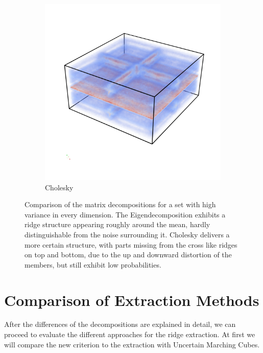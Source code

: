 \begin{figure}
\begin{subfigure}[b]{0.49\textwidth}
        \includegraphics[trim=0 350 0 300, clip=true, width=\textwidth]{Images/highuncChol.png}
        \caption{Cholesky}
        \label{fig:HUCchol}
    \end{subfigure}
    \caption{Comparison of the matrix decompositions for a set with high
    variance in every dimension. The Eigendecomposition exhibits a ridge
    structure appearing roughly around the mean, hardly distinguishable
    from the noise surrounding it. Cholesky delivers a more certain
    structure, with parts missing from the cross like ridges on top and
    bottom, due to the up and downward distortion of the members, but
    still exhibit low probabilities.}
    \label{fig:HUCcomp}
\end{figure}

\section{Comparison of Extraction Methods}\label{sec:evalExtr}

After the differences of the decompositions are explained in detail, we
can proceed to evaluate the different approaches for the ridge
extraction. At first we will compare the new criterion to the extraction
with Uncertain Marching Cubes.

